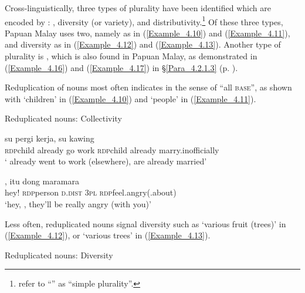 Cross-linguistically, three types of plurality have been identified which are encoded by   \citep[561]{Wiltshire.1978}: , diversity (or variety), and distributivity.\footnote{\citet[561]{Wiltshire.1978} refer to “” as “simple plurality”.} Of these three types, Papuan Malay uses two, namely  as in (\ref{Example_4.10}) and (\ref{Example_4.11}), and diversity as in (\ref{Example_4.12}) and (\ref{Example_4.13}). Another type of plurality is  \citep{Rubino.2013}, which is also found in Papuan Malay, as demonstrated in (\ref{Example_4.16}) and (\ref{Example_4.17}) in §\ref{Para_4.2.1.3} (p. \pageref{Example_4.16}).


Reduplication of nouns most often indicates  in the sense of ``all \textsc{base}'', as shown with  ‘children’ in (\ref{Example_4.10}) and  ‘people’ in (\ref{Example_4.11}).


\begin{styleExampleTitle}
Reduplicated nouns: Collectivity
\end{styleExampleTitle}

\ea
\label{Example_4.10}
 {su} {pergi} {kerja}, {} {su} {kawing}\\ %
 \textsc{rdp}{\Tilde}child  already  go  work  \textsc{rdp}{\Tilde}child  already  marry.inofficially\\

 ‘ already went to work (elsewhere),  are already married’ \textstyleExampleSource{[080917-010-CvEx.0071]}
\z

\ea
\label{Example_4.11}
, {} {itu} {dong} {mara{\Tilde}mara}\\ %
 hey!  \textsc{rdp}{\Tilde}person  \textsc{d.dist}  \textsc{3pl}  \textsc{rdp}{\Tilde}feel.angry(.about)\\

\glt 
‘hey, , they’ll be really angry (with you)’ \textstyleExampleSource{[080917-008-NP.0053]}
\z


Less often, reduplicated nouns signal diversity such as  ‘various fruit (trees)’ in (\ref{Example_4.12}), or  ‘various trees’ in (\ref{Example_4.13}).


\newpage
\begin{styleExampleTitle}
Reduplicated nouns: Diversity
\end{styleExampleTitle}

